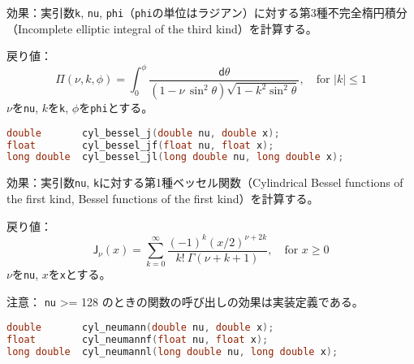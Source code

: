 \noindent
\textsf{効果}：実引数\lstinline!k!, \lstinline!nu!,
\lstinline!phi!（\lstinline!phi!の単位はラジアン）に対する第3種不完全楕円積分（Incomplete
elliptic integral of the third kind）を計算する。

\noindent
\textsf{戻り値}：
\[
  \mathsf{\Pi}(\nu, k, \phi) =
  \int_0^\phi \! \frac{ \mathsf{d}\theta }
                      { (1 - \nu \, \sin^2 \theta) \sqrt{1 - k^2 \sin^2 \theta} },
       \quad \mbox{for $|k| \le 1$}
\]
\hspace*{3em}\(\nu\)を\lstinline!nu!, \(k\)を\lstinline!k!,
\(\phi\)を\lstinline!phi!とする。

%

\bgroup
\begin{lstlisting}[language=C++, aboveskip=0.0zw]
double       cyl_bessel_j(double nu, double x);
float        cyl_bessel_jf(float nu, float x);
long double  cyl_bessel_jl(long double nu, long double x);
\end{lstlisting}
\egroup

\noindent
\textsf{効果}：実引数\lstinline!nu!,
\lstinline!k!に対する第1種ベッセル関数（Cylindrical Bessel functions of
the first kind, Bessel functions of the first kind）を計算する。

\noindent
\textsf{戻り値}：
\[
  \mathsf{J}_\nu(x) =
  \sum_{k=0}^\infty \frac{(-1)^k (x/2)^{\nu+2k}}
             {k! \: \Gamma(\nu+k+1)},
       \quad \mbox{for $x \ge 0$}
\]
\hspace*{3em}\(\nu\)を\lstinline!nu!, \(x\)を\lstinline!x!とする。

\noindent
\textsf{注意}： \lstinline!nu! \textgreater{}= 128
のときの関数の呼び出しの効果は実装定義である。

%

\bgroup
\begin{lstlisting}[language=C++, aboveskip=0.0zw]
double       cyl_neumann(double nu, double x);
float        cyl_neumannf(float nu, float x);
long double  cyl_neumannl(long double nu, long double x);
\end{lstlisting}
\egroup

